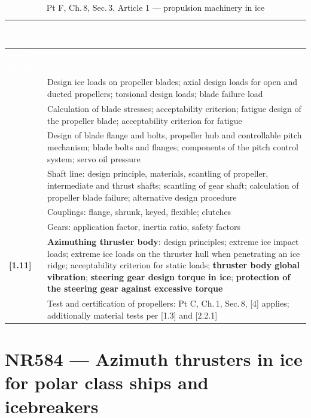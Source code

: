 \documentclass[11pt,a4paper]{report}
\begin{document}
\begin{longtable}{|p{2.6cm}|p{12.3cm}|}
\caption{Pt F, Ch.\,8, Sec.\,3, Article 1 --- propulsion machinery in ice} \label{tab:iceart1} \\
\hline
\rowcolor{bvblue}
\textcolor{white}{\textbf{Sub-article}} & \textcolor{white}{\textbf{Content}} \\
\hline
\endfirsthead
\hline
\rowcolor{bvblue}
\textcolor{white}{\textbf{Sub-article}} & \textcolor{white}{\textbf{Content}} \\
\hline
\endhead
\hline
\endlastfoot
[1.4] & Design ice loads on propeller blades; axial design loads for open and ducted propellers; torsional design loads; blade failure load \\
\hline
[1.5] & Calculation of blade stresses; acceptability criterion; fatigue design of the propeller blade; acceptability criterion for fatigue \\
\hline
[1.6] & Design of blade flange and bolts, propeller hub and controllable pitch mechanism; blade bolts and flanges; components of the pitch control system; servo oil pressure \\
\hline
[1.7] & Shaft line: design principle, materials, scantling of propeller, intermediate and thrust shafts; scantling of gear shaft; calculation of propeller blade failure; alternative design procedure \\
\hline
[1.8] & Couplings: flange, shrunk, keyed, flexible; clutches \\
\hline
[1.9] & Gears: application factor, inertia ratio, safety factors \\
\hline
\textbf{[1.11]} & \textbf{Azimuthing thruster body}: design principles; extreme ice impact loads; extreme ice loads on the thruster hull when penetrating an ice ridge; acceptability criterion for static loads; \textbf{thruster body global vibration}; \textbf{steering gear design torque in ice}; \textbf{protection of the steering gear against excessive torque} \\
\hline
[3.6.1] & Test and certification of propellers: Pt C, Ch.\,1, Sec.\,8, [4] applies; additionally material tests per [1.3] and [2.2.1] \\
\hline
\end{longtable}

\newpage

\section{NR584 --- Azimuth thrusters in ice for polar class ships and icebreakers}
\label{sec:nr584}
\end{document}
